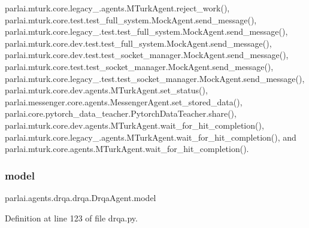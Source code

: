 parlai.\+mturk.\+core.\+legacy\+\_.\+agents.\+M\+Turk\+Agent.\+reject\+\_\+work(), parlai.\+mturk.\+core.\+test.\+test\+\_\+full\+\_\+system.\+Mock\+Agent.\+send\+\_\+message(), parlai.\+mturk.\+core.\+legacy\+\_.\+test.\+test\+\_\+full\+\_\+system.\+Mock\+Agent.\+send\+\_\+message(), parlai.\+mturk.\+core.\+dev.\+test.\+test\+\_\+full\+\_\+system.\+Mock\+Agent.\+send\+\_\+message(), parlai.\+mturk.\+core.\+dev.\+test.\+test\+\_\+socket\+\_\+manager.\+Mock\+Agent.\+send\+\_\+message(), parlai.\+mturk.\+core.\+test.\+test\+\_\+socket\+\_\+manager.\+Mock\+Agent.\+send\+\_\+message(), parlai.\+mturk.\+core.\+legacy\+\_.\+test.\+test\+\_\+socket\+\_\+manager.\+Mock\+Agent.\+send\+\_\+message(), parlai.\+mturk.\+core.\+dev.\+agents.\+M\+Turk\+Agent.\+set\+\_\+status(), parlai.\+messenger.\+core.\+agents.\+Messenger\+Agent.\+set\+\_\+stored\+\_\+data(), parlai.\+core.\+pytorch\+\_\+data\+\_\+teacher.\+Pytorch\+Data\+Teacher.\+share(), parlai.\+mturk.\+core.\+dev.\+agents.\+M\+Turk\+Agent.\+wait\+\_\+for\+\_\+hit\+\_\+completion(), parlai.\+mturk.\+core.\+legacy\+\_.\+agents.\+M\+Turk\+Agent.\+wait\+\_\+for\+\_\+hit\+\_\+completion(), and parlai.\+mturk.\+core.\+agents.\+M\+Turk\+Agent.\+wait\+\_\+for\+\_\+hit\+\_\+completion().

\mbox{\label{classparlai_1_1agents_1_1drqa_1_1drqa_1_1DrqaAgent_a4b32188969b359bb5b9e28766388a26e}} 
\subsubsection{\texorpdfstring{model}{model}}
{\footnotesize\ttfamily parlai.\+agents.\+drqa.\+drqa.\+Drqa\+Agent.\+model}



Definition at line 123 of file drqa.\+py.



